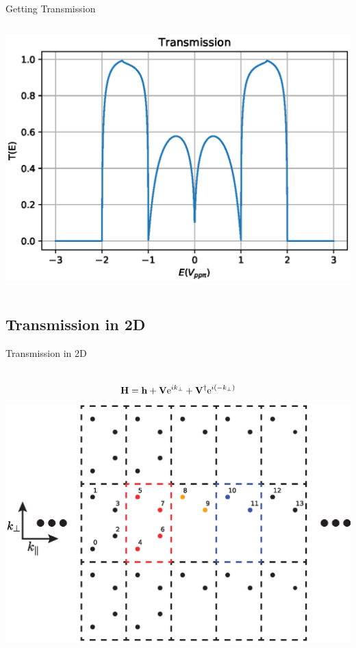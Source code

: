 \documentclass[hyperref={colorlinks=true,urlcolor=blue,linkcolor=.},aspectratio=1610,mathserif]{beamer}
\newcommand{\me}{\mathrm{e}}
\newcommand{\im}[3]{\inputminted[linenos=true, python3=true, firstline=#2, lastline=#3]{python}{#1}}
\begin{document}
\begin{frame}{Getting Transmission}
\begin{overprint}
\begin{columns}[c]
    \includegraphics[width=\textwidth]{Figures/BetaTE.eps}
    \end{columns}
\end{overprint}
\end{frame}

\subsection{Transmission in 2D}

\begin{frame}{Transmission in 2D}
\centering
\begin{columns}[c]
		    \begin{align*}
		        \vb{H} = \vb{h} + \vb{V}\me^{ik_{\perp}} + \vb{V}^{\dagger} \me^{i\pqty{-k_{\perp}}}
		    \end{align*}
			\includegraphics[width=.7\textwidth]{Figures/2DTrans.eps}
\end{columns}
\begin{columns}[c]
    \im{Listings/Functions.py}{250}{253}    
\end{columns}

\end{frame}
\end{document}
